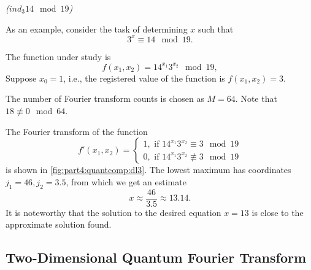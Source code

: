 \begin{example}
\emph{($ind_3{14} \mod{19}$)}

As an example, consider the task of determining $x$ such that 
\[
3^x \equiv 14 \mod 19.
\]

The function under study is
\[
f(x_1, x_2) = 14^{x_1} 3^{x_2} \mod 19,
\]
Suppose $x_0 = 1$, i.e., the registered value of the function is $f(x_1, x_2) = 3$.



The number of Fourier transform counts is chosen as $M=64$. Note that $18 \not\equiv 0 \mod 64$.

The Fourier transform of the function 
\[
f'(x_1, x_2) = 
\begin{cases}
1, \mbox{ if } 14^{x_1} 3^{x_2} \equiv 3 \mod 19 \\
0, \mbox{ if } 14^{x_1} 3^{x_2} \not\equiv 3 \mod 19 
\end{cases}
\]
is shown in \autoref{fig:part4:quantcomp:dl3}. The lowest maximum
has coordinates $j_1 = 46, j_2 = 3.5$, from which we get an estimate 
\[
x \approx \frac{46}{3.5} \approx 13.14.
\]
It is noteworthy that the solution to the desired equation $x = 13$ is close to the approximate solution found.
\label{ex:part4:quantcomp:discretlog:periodfinding2}
\end{example}

\subsection{Two-Dimensional Quantum Fourier Transform}



